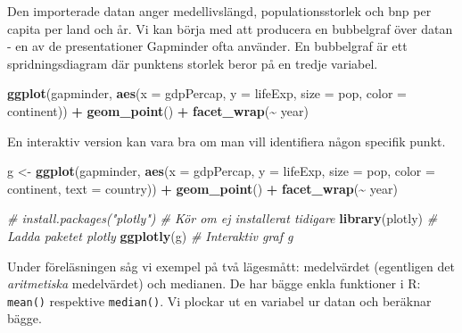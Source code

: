 \documentclass[
]{book}
\newenvironment{Shaded}{\begin{snugshade}}{\end{snugshade}}
\newcommand{\AttributeTok}[1]{\textcolor[rgb]{0.13,0.29,0.53}{#1}}
\newcommand{\CommentTok}[1]{\textcolor[rgb]{0.56,0.35,0.01}{\textit{#1}}}
\newcommand{\FunctionTok}[1]{\textcolor[rgb]{0.13,0.29,0.53}{\textbf{#1}}}
\newcommand{\NormalTok}[1]{#1}
\newcommand{\OtherTok}[1]{\textcolor[rgb]{0.56,0.35,0.01}{#1}}
\newcommand{\SpecialCharTok}[1]{\textcolor[rgb]{0.81,0.36,0.00}{\textbf{#1}}}
\theoremstyle{definition}
\theoremstyle{definition}
\theoremstyle{definition}
\theoremstyle{definition}
\theoremstyle{remark}
\begin{document}
Den importerade datan anger medellivslängd, populationsstorlek och bnp per capita per land och år. Vi kan börja med att producera en bubbelgraf över datan - en av de presentationer Gapminder ofta använder. En bubbelgraf är ett spridningsdiagram där punktens storlek beror på en tredje variabel.

\begin{Shaded}
\begin{Highlighting}[]
\FunctionTok{ggplot}\NormalTok{(gapminder, }\FunctionTok{aes}\NormalTok{(}\AttributeTok{x =}\NormalTok{ gdpPercap, }\AttributeTok{y =}\NormalTok{ lifeExp, }
                      \AttributeTok{size =}\NormalTok{ pop, }\AttributeTok{color =}\NormalTok{ continent)) }\SpecialCharTok{+}
  \FunctionTok{geom\_point}\NormalTok{() }\SpecialCharTok{+}
  \FunctionTok{facet\_wrap}\NormalTok{(}\SpecialCharTok{\textasciitilde{}}\NormalTok{ year)}
\end{Highlighting}
\end{Shaded}

En interaktiv version kan vara bra om man vill identifiera någon specifik punkt.

\begin{Shaded}
\begin{Highlighting}[]
\NormalTok{g }\OtherTok{\textless{}{-}} \FunctionTok{ggplot}\NormalTok{(gapminder, }\FunctionTok{aes}\NormalTok{(}\AttributeTok{x =}\NormalTok{ gdpPercap, }\AttributeTok{y =}\NormalTok{ lifeExp, }\AttributeTok{size =}\NormalTok{ pop, }
                           \AttributeTok{color =}\NormalTok{ continent, }\AttributeTok{text =}\NormalTok{ country)) }\SpecialCharTok{+}
  \FunctionTok{geom\_point}\NormalTok{() }\SpecialCharTok{+}
  \FunctionTok{facet\_wrap}\NormalTok{(}\SpecialCharTok{\textasciitilde{}}\NormalTok{ year)}

\CommentTok{\# install.packages("plotly")  \# Kör om ej installerat tidigare}
\FunctionTok{library}\NormalTok{(plotly)               }\CommentTok{\# Ladda paketet plotly}
\FunctionTok{ggplotly}\NormalTok{(g)                   }\CommentTok{\# Interaktiv graf g}
\end{Highlighting}
\end{Shaded}

Under föreläsningen såg vi exempel på två lägesmått: medelvärdet (egentligen det \emph{aritmetiska} medelvärdet) och medianen. De har bägge enkla funktioner i R: \texttt{mean()} respektive \texttt{median()}. Vi plockar ut en variabel ur datan och beräknar bägge.

\begin{Shaded}
\end{Shaded}
\end{document}

